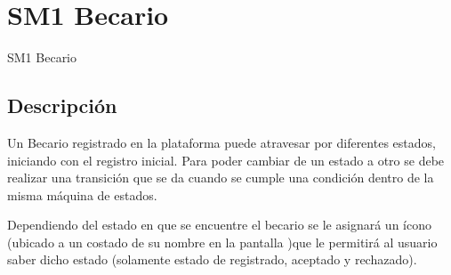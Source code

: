 \newpage

\section{SM1 Becario}
\hypertarget{SM1 Becario}{SM1 Becario}

\subsection{Descripción}
    Un Becario registrado en la plataforma puede atravesar por diferentes estados,
    iniciando con el registro inicial. Para poder cambiar de un estado a otro se debe realizar una transición que se da cuando se cumple una condición dentro de la misma máquina de estados.

   Dependiendo del estado en que se encuentre el becario se le asignará un ícono (ubicado a un costado de su nombre en la pantalla )que le permitirá al usuario saber dicho estado (solamente estado de registrado, aceptado y rechazado). 
   
